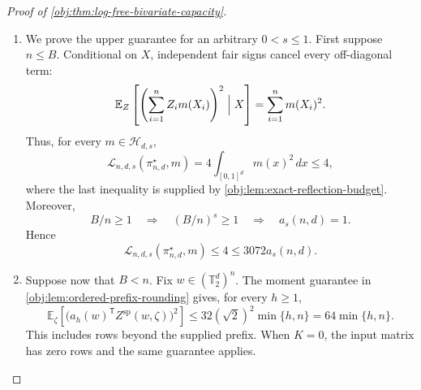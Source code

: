 \begin{proof}[Proof of \cref{obj:thm:log-free-bivariate-capacity}]
\begin{enumerate}
For every fixed \(\mathbf x,\eta,T\), \cref{obj:lem:ordered-prefix-rounding}, applied with row bound \(\sqrt2\), gives
\[
\mathbb E_\zeta
Z_i^{\mathrm{sp}}(W(\mathbf x,\eta,T),\zeta)=0.
\]
Integration over \(\eta,T\), together with the independent-sign branch, yields
\[
\int_{\{-1,1\}^n}z_i\,\pi^\star_{n,d}(\mathbf x,dz)=0
\qquad(1\leq i\leq n)
\]
for every original sample. The feature evaluations, reflection lift, torus addition, and rounding output are Borel measurable; integrating their output against the probability seed law gives a Borel probability kernel. Drawing assignments from this covariate kernel gives
\[
Z\perp Y\mid X
\]
for every pre-assignment law allowed in \cref{obj:ass:assignment-independence}. Consequently,
\[
\pi^\star_{n,d}\in\mathcal D_{n,d,s}.
\]
Its branch choice, feature ordering, and seed distribution are independent of \(s\).

\item
We prove the upper guarantee for an arbitrary \(0<s\leq1\). First suppose \(n\leq B\). Conditional on \(X\), independent fair signs cancel every off-diagonal term:
\[
\mathbb E_Z\left[
\left(\sum_{i=1}^n Z_i m(X_i)\right)^2\Bigm|X
\right]
=
\sum_{i=1}^n m(X_i)^2.
\]
Thus, for every \(m\in\mathcal H_{d,s}\),
\[
\mathcal L_{n,d,s}(\pi^\star_{n,d},m)
=
4\int_{[0,1]^d}m(x)^2\,dx
\leq4,
\]
where the last inequality is supplied by \cref{obj:lem:exact-reflection-budget}.
Moreover,
\[
B/n\geq1
\quad\Longrightarrow\quad
(B/n)^s\geq1
\quad\Longrightarrow\quad
a_s(n,d)=1.
\]
Hence
\[
\mathcal L_{n,d,s}(\pi^\star_{n,d},m)
\leq4\leq3072a_s(n,d).
\]

\item
Suppose now that \(B<n\). Fix \(w\in(\mathbb T_2^d)^n\).
The moment guarantee in \cref{obj:lem:ordered-prefix-rounding} gives, for every \(h\geq1\),
\[
\mathbb E_\zeta
\left[
\bigl(a_h(w)^{\mathsf T}Z^{\mathrm{sp}}(w,\zeta)\bigr)^2
\right]
\leq32(\sqrt2)^2\min\{h,n\}
=
64\min\{h,n\}.
\]
This includes rows beyond the supplied prefix. When \(K=0\), the input matrix has zero rows and the same guarantee applies.


\end{enumerate}
\end{proof}
